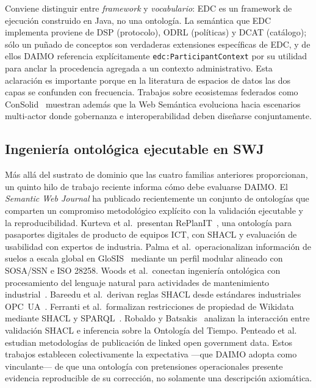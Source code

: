 \documentclass[Afour,sagev,times]{sagej}
\newcommand{\code}[1]{\texttt{#1}}
\begin{document}
Conviene distinguir entre \emph{framework} y \emph{vocabulario}: EDC es un framework de ejecución construido en Java, no una ontología. La semántica que EDC implementa proviene de DSP (protocolo), ODRL (políticas) y DCAT (catálogo); sólo un puñado de conceptos son verdaderas extensiones específicas de EDC, y de ellos DAIMO referencia explícitamente \code{edc:ParticipantContext} por su utilidad para anclar la procedencia agregada a un contexto administrativo. Esta aclaración es importante porque en la literatura de espacios de datos las dos capas se confunden con frecuencia. Trabajos sobre ecosistemas federados como ConSolid~\cite{werbrouck24} muestran además que la Web Semántica evoluciona hacia escenarios multi-actor donde gobernanza e interoperabilidad deben diseñarse conjuntamente.

\subsection{Ingeniería ontológica ejecutable en SWJ}

Más allá del sustrato de dominio que las cuatro familias anteriores proporcionan, un quinto hilo de trabajo reciente informa cómo debe evaluarse DAIMO. El \emph{Semantic Web Journal} ha publicado recientemente un conjunto de ontologías que comparten un compromiso metodológico explícito con la validación ejecutable y la reproducibilidad. Kurteva et al.\ presentan RePlanIT~\cite{kurteva}, una ontología para pasaportes digitales de producto de equipos ICT, con SHACL y evaluación de usabilidad con expertos de industria. Palma et al.\ operacionalizan información de suelos a escala global en GloSIS~\cite{palma} mediante un perfil modular alineado con SOSA/SSN e ISO 28258. Woods et al.\ conectan ingeniería ontológica con procesamiento del lenguaje natural para actividades de mantenimiento industrial~\cite{woods}. Bareedu et al.\ derivan reglas SHACL desde estándares industriales OPC~UA~\cite{bareedu24}. Ferranti et al.\ formalizan restricciones de propiedad de Wikidata mediante SHACL y SPARQL~\cite{ferranti}. Robaldo y Batsakis~\cite{robaldo} analizan la interacción entre validación SHACL e inferencia sobre la Ontología del Tiempo. Penteado et al.~\cite{penteado23} estudian metodologías de publicación de linked open government data. Estos trabajos establecen colectivamente la expectativa ---que DAIMO adopta como vinculante--- de que una ontología con pretensiones operacionales presente evidencia reproducible de su corrección, no solamente una descripción axiomática.
\end{document}
